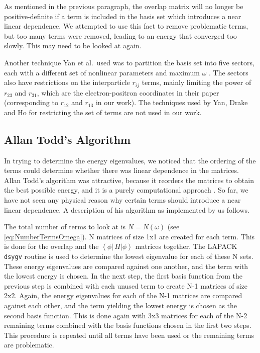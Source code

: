\documentclass[Dissertation.tex]{subfiles}
\begin{document}
As mentioned in the previous paragraph, the overlap matrix will no longer be positive-definite if a term is included in the basis set which introduces a near linear dependence. We attempted to use this fact to remove problematic terms, but too many terms were removed, leading to an energy that converged too slowly. This may need to be looked at again.

Another technique Yan et al.\ used was to partition the basis set into five sectors, each with a different set of nonlinear parameters and maximum $\omega$ \cite{Yan1999}. The sectors also have restrictions on the interparticle $r_{ij}$ terms, mainly limiting the power of $r_{23}$ and $r_{31}$, which are the electron-positron coordinates in their paper (corresponding to $r_{12}$ and $r_{13}$ in our work). The techniques used by Yan, Drake and Ho for restricting the set of terms are not used in our work.


\subsection{Allan Todd's Algorithm}
\label{sec:ToddBound}
In trying to determine the energy eigenvalues, we noticed that the ordering 
of the terms could determine whether there was linear dependence in the 
matrices. Allan Todd's algorithm was attractive, because it reorders the 
matrices to obtain the best possible energy, and it is a purely computational 
approach \cite{Todd2007}. So far, we have not seen any physical reason why 
certain terms should introduce a near linear dependence. A description of his 
algorithm as implemented by us follows.

The total number of terms to look at is $N = N(\omega)$ (see \cref{eq:NumberTermsOmega}).
 N matrices of size 1x1 are created for each term. This 
is done for the overlap and the
 $\left\langle \phi \left| \,H \right| \phi \right\rangle$
 matrices together. The LAPACK \texttt{dsygv} routine is used to 
determine the lowest eigenvalue for each of these N sets. These energy 
eigenvalues are compared against one another, and the term with the lowest 
energy is chosen. In the next step, the first basis function from the 
previous step is combined with each unused term to create N-1 matrices of 
size 2x2. Again, the energy eigenvalues for each of the N-1 matrices are 
compared against each other, and the term yielding the lowest energy is 
chosen as the second basis function. This is done again with 3x3 matrices for 
each of the N-2 remaining terms combined with the basis functions chosen in 
the first two steps. This procedure is repeated until all terms have been 
used or the remaining terms are problematic.
\end{document}

